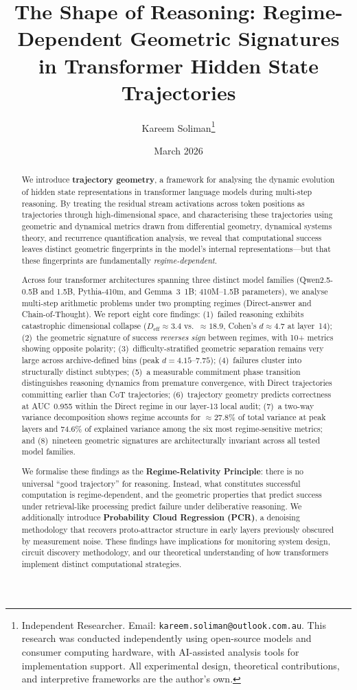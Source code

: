 \documentclass[11pt,twocolumn]{article}
\title{The Shape of Reasoning: Regime-Dependent Geometric Signatures\\in Transformer Hidden State Trajectories}
\author{
Kareem Soliman\thanks{Independent Researcher. Email: \texttt{kareem.soliman@outlook.com.au}. This research was conducted independently using open-source models and consumer computing hardware, with AI-assisted analysis tools for implementation support. All experimental design, theoretical contributions, and interpretive frameworks are the author's own.}
}
\date{March 2026}
\newcommand{\Deff}{D_{\text{eff}}}
\begin{document}
\maketitle

\begin{abstract}
We introduce \textbf{trajectory geometry}, a framework for analysing the dynamic evolution of hidden state representations in transformer language models during multi-step reasoning. By treating the residual stream activations across token positions as trajectories through high-dimensional space, and characterising these trajectories using geometric and dynamical metrics drawn from differential geometry, dynamical systems theory, and recurrence quantification analysis, we reveal that computational success leaves distinct geometric fingerprints in the model's internal representations---but that these fingerprints are fundamentally \emph{regime-dependent}.

Across four transformer architectures spanning three distinct model families (Qwen2.5-0.5B and 1.5B, Pythia-410m, and Gemma~3~1B; 410M--1.5B parameters), we analyse multi-step arithmetic problems under two prompting regimes (Direct-answer and Chain-of-Thought). We report eight core findings: (1)~failed reasoning exhibits catastrophic dimensional collapse ($\Deff \approx 3.4$ vs.\ $\approx 18.9$, Cohen's $d \approx 4.7$ at layer~14); (2)~the geometric signature of success \emph{reverses sign} between regimes, with 10+ metrics showing opposite polarity; (3)~difficulty-stratified geometric separation remains very large across archive-defined bins (peak $d = 4.15$--$7.75$); (4)~failures cluster into structurally distinct subtypes; (5)~a measurable commitment phase transition distinguishes reasoning dynamics from premature convergence, with Direct trajectories committing earlier than CoT trajectories; (6)~trajectory geometry predicts correctness at AUC~0.955 within the Direct regime in our layer-13 local audit; (7)~a two-way variance decomposition shows regime accounts for $\approx 27.8\%$ of total variance at peak layers and 74.6\% of explained variance among the six most regime-sensitive metrics; and (8)~nineteen geometric signatures are architecturally invariant across all tested model families.

We formalise these findings as the \textbf{Regime-Relativity Principle}: there is no universal ``good trajectory'' for reasoning. Instead, what constitutes successful computation is regime-dependent, and the geometric properties that predict success under retrieval-like processing predict failure under deliberative reasoning. We additionally introduce \textbf{Probability Cloud Regression (PCR)}, a denoising methodology that recovers proto-attractor structure in early layers previously obscured by measurement noise. These findings have implications for monitoring system design, circuit discovery methodology, and our theoretical understanding of how transformers implement distinct computational strategies.


\end{abstract}
\end{document}
